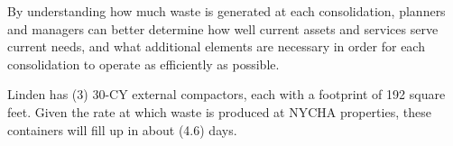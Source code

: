 
    By understanding how much waste is generated at each consolidation, planners and managers
    can better determine how well current assets and services serve current needs, and what additional 
    elements are necessary in order for each consolidation to operate as efficiently as possible. 

    Linden has (3) 30-CY external compactors, each with a footprint of 192 square feet. Given the rate at which waste is produced at NYCHA properties, these containers will fill
    up in about (4.6) days.